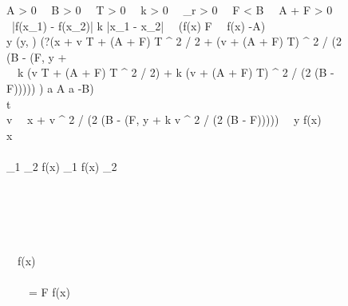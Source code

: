 \begin{figure}[p]
\begin{center}
\begin{sllisting}
\Init \Equiv A > 0 \, \land \, B > 0 \, \land \, T > 0 \, \land \, k > 0 \, \land \, \eta_r > 0 \, \land \, F < B \, \land \, A + F > 0 \, \land \, \\
    \slind[2] \,   |f(x_1) - f(x_2)| \le k |x_1 - x_2| \, \land \,  (f(x) \le F \, \land \, f(x) \ge -A)\\
\Ctrl \Equiv y \dlassign \min(y, \TrainFxMax) \seq (?(x + v T + (A + F) \cdot T ^ 2 / 2 + (v + (A + F) \cdot T) ^ 2 / (2 (B - \min(F, y + \\
    \slind[2] \, \, k (v T + (A + F) \cdot T ^ 2 / 2) + k (v + (A + F) \cdot T) ^ 2 / (2 (B - F))))) ) \seq a \dlassign A \cup a \dlassign -B)\\
\Plant \Equiv t  \seq {}\\
\Inv \Equiv v  \, \land \, x + v ^ 2 / (2 (B - \min(F, y + k v ^ 2 / (2 (B - F)))))  \, \land \, y \ge f(x)\\
\Safe \Equiv x \\
\pbmonotonicity\\
  \hspace{0.5em}\text{--}\hspace{0.4em}\TrainFxMax_1 \le \TrainFxMax_2 \limply f(x) \le \TrainFxMax_1 \limply f(x) \le \TrainFxMax_2\\
\pbmodel\\
  \hspace{0.5em}\text{--}\hspace{0.4em}\\
\pbsafe\\
  \hspace{0.5em}\text{--}\hspace{0.4em}\Init \, \land \, \Inv \limply \Safe\\
\pbtotality\\
  \hspace{0.5em}\text{--}\hspace{0.4em}\Init \, \land \, f(x) \le \TrainFxMax \, \land \, \Inv \limply \ldiamond{\Ctrl}{\True}\\
\pbinference\\
  \hspace{0.5em}\text{--}\hspace{0.4em}\Init \, \land \, \Inv \, \land \, \TrainFxMax = F \limply f(x) \le \TrainFxMax\\

\end{sllisting}
\end{center}
\end{figure}
